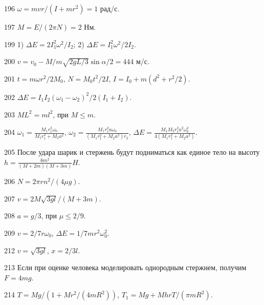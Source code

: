 \begin{Answer}{196}
$\omega = mvr/(I+mr^2) = 1$ рад/с.
\end{Answer}
\begin{Answer}{197}
$M = E / (2 \pi N) = 2$ Нм.
\end{Answer}
\begin{Answer}{199}
1) $\Delta E = 2I_1^2\omega^2/I_2$; 2) $\Delta E = I_1^2\omega^2/2I_2$.
\end{Answer}
\begin{Answer}{200}
$v = v_0 -M/m \sqrt{2gL/3} \sin \alpha /2 = 444$ м/с.
\end{Answer}
\begin{Answer}{201}
$t = m\omega r^2 / 2M_0$, $N = M_0t^2/2I$, $I = I_0 + m(d^2 + r^2/2)$.
\end{Answer}
\begin{Answer}{202}
$\Delta E = I_1 I_2 (\omega_1 - \omega_2)^2/ 2(I_1 + I_2)$.
\end{Answer}
\begin{Answer}{203}
$ML^2 = ml^2$, при $M \leq m$.
\end{Answer}
\begin{Answer}{204}
$\omega_1 = \frac{M_1r_1^2\omega_0}{M_1r_1^2 + M_2a^2}$, $\omega_2 = \frac{M_1r_1^2 a \omega_0}{(M_1r_1^2 + M_2a^2)r_2}$, $\Delta E = \frac{M_1 M_2r_1^2a^2\omega_0^2}{4(M_1r_1^2 + M_2a^2)}$.
\end{Answer}
\begin{Answer}{205}
После удара шарик и стержень будут подниматься как единое тело на высоту $h = \frac{6m^2}{(M+2m)(M+3m)}H$.
\end{Answer}
\begin{Answer}{206}
$N = 2\pi r n^2/(4 \mu g)$.
\end{Answer}
\begin{Answer}{207}
$v = 2M\sqrt{3gl}/(M+3m)$.
\end{Answer}
\begin{Answer}{208}
$a = g/3$, при $\mu \leq 2/9$.
\end{Answer}
\begin{Answer}{209}
$v = 2/7r \omega_0$, $\Delta E = 1/7 mr^2 \omega_0^2$.
\end{Answer}
\begin{Answer}{212}
$v = \sqrt{3gl}$, $x = 2/3l$.
\end{Answer}
\begin{Answer}{213}
Если при оценке человека моделировать однородным стержнем, получим $F = 4mg$.
\end{Answer}
\begin{Answer}{214}
$T = Mg/(1 + Mr^2/(4mR^2))$, $T_1 = Mg + MhrT/(\pi m R^2)$.
\end{Answer}
